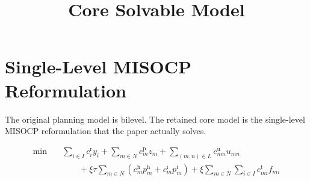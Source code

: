 \documentclass[11pt,a4paper]{article}
\title{Core Solvable Model}
\author{}
\date{}
\begin{document}
\maketitle

\section*{Single-Level MISOCP Reformulation}
The original planning model is bilevel. The retained core model is the single-level MISOCP
reformulation that the paper actually solves.

\begin{equation}
\begin{aligned}
\min \quad
& \sum_{i \in I} c_i^{\mathrm r} y_i
+ \sum_{m \in N} c_m^{\mathrm p} z_m
+ \sum_{(m,n) \in L} c_{mn}^{\mathrm u} u_{mn} \\
& \qquad
+ \xi \tau \sum_{m \in N} \left(c_m^{\mathrm h} p_m^{\mathrm h} + c_m^{\mathrm i} p_m^{\mathrm i}\right)
+ \xi \sum_{m \in N} \sum_{i \in I} c_{mi}^{\mathrm t} f_{mi}
\end{aligned}
\tag{M1}
\end{equation}
\end{document}
